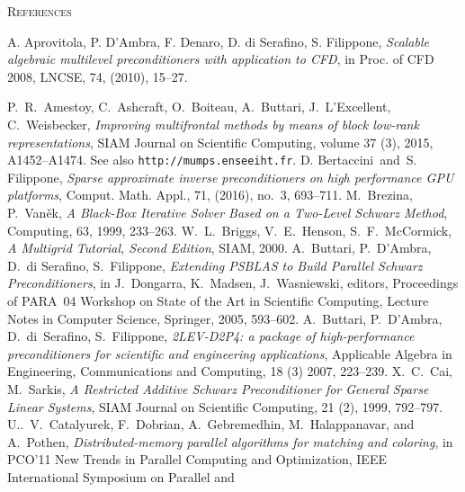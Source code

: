 \begin{thebibliography}{99}
\ifpdf
{}
\fi
{}
         {\textsc{References}}

%
	 A. Aprovitola, P. D'Ambra, F. Denaro, D. di Serafino, S. Filippone, {\em Scalable algebraic multilevel preconditioners with application to CFD}, in Proc. of CFD 2008, LNCSE, 74, (2010), 15--27.

P.~R.~Amestoy, C.~Ashcraft, O.~Boiteau, A.~Buttari, J.~L'Excellent, C.~Weisbecker,
{\em Improving multifrontal methods by means of block low-rank representations},
SIAM Journal on Scientific Computing, volume 37 (3), 2015, A1452--A1474.
See also {\tt http://mumps.enseeiht.fr}.
%
D. Bertaccini\ and\ S. Filippone, 
{\em Sparse approximate inverse preconditioners on high performance GPU platforms}, 
Comput. Math. Appl.,  71, (2016), no.~3, 693--711.
%
M.~Brezina, P.~Van\v{e}k,
{\em A Black-Box Iterative Solver Based on a Two-Level Schwarz Method},
Computing, 63, 1999, 233--263.
%
W.~L.~Briggs, V.~E.~Henson, S.~F.~McCormick,
{\em A Multigrid Tutorial, Second Edition},
SIAM, 2000.
%
A.~Buttari, P.~D'Ambra, D.~di Serafino, S.~Filippone,
{\em Extending PSBLAS to Build Parallel Schwarz Preconditioners},
in J.~Dongarra, K.~Madsen, J.~Wasniewski, editors,
Proceedings of PARA~04 Workshop on State of the Art
in Scientific Computing, Lecture Notes in Computer Science,
Springer, 2005, 593--602.
%
A.~Buttari, P.~D'Ambra, D.~di~Serafino, S.~Filippone,
{\em 2LEV-D2P4: a package of high-performance preconditioners
for scientific and engineering applications},
Applicable Algebra in Engineering, Communications and Computing,
18 (3) 2007, 223--239.
%
%
X.~C.~Cai, M.~Sarkis,
{\em A Restricted Additive Schwarz Preconditioner for General Sparse Linear Systems},
SIAM Journal on Scientific Computing, 21 (2), 1999, 792--797.
%
U..~V.~Catalyurek, F.~Dobrian, A.~Gebremedhin, M.~Halappanavar, and A.~Pothen,
{\em Distributed-memory parallel algorithms for matching and coloring}, in PCO’11 New Trends
in Parallel Computing and Optimization, IEEE International Symposium on Parallel and

\end{thebibliography}
